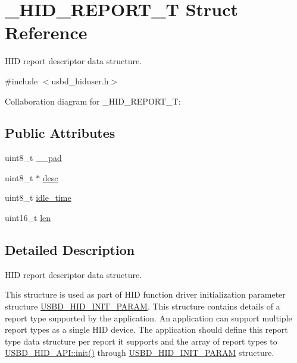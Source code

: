 \hypertarget{struct__HID__REPORT__T}{}\section{\+\_\+\+H\+I\+D\+\_\+\+R\+E\+P\+O\+R\+T\+\_\+T Struct Reference}
\label{struct__HID__REPORT__T}


H\+ID report descriptor data structure.  




{\ttfamily \#include $<$usbd\+\_\+hiduser.\+h$>$}



Collaboration diagram for \+\_\+\+H\+I\+D\+\_\+\+R\+E\+P\+O\+R\+T\+\_\+T\+:
\subsection*{Public Attributes}
\begin{DoxyCompactItemize}
\item 
uint8\+\_\+t \hyperlink{struct__HID__REPORT__T_a9d56a95a8b9dbdc3bfaec651d23bd360}{\+\_\+\+\_\+pad}
\item 
uint8\+\_\+t $\ast$ \hyperlink{struct__HID__REPORT__T_a312421c8506e4dcd1ba2d40a9c409211}{desc}
\item 
uint8\+\_\+t \hyperlink{struct__HID__REPORT__T_a388e7eacbfc2006e0ada9e81da54760b}{idle\+\_\+time}
\item 
uint16\+\_\+t \hyperlink{struct__HID__REPORT__T_a4c0e68b7360c08788605db4eb667cb4e}{len}
\end{DoxyCompactItemize}


\subsection{Detailed Description}
H\+ID report descriptor data structure. 

This structure is used as part of H\+ID function driver initialization parameter structure \hyperlink{structUSBD__HID__INIT__PARAM}{U\+S\+B\+D\+\_\+\+H\+I\+D\+\_\+\+I\+N\+I\+T\+\_\+\+P\+A\+R\+AM}. This structure contains details of a report type supported by the application. An application can support multiple report types as a single H\+ID device. The application should define this report type data structure per report it supports and the array of report types to \hyperlink{structUSBD__HID__API_a7b98c434713f1deb07abafcb52fae76d}{U\+S\+B\+D\+\_\+\+H\+I\+D\+\_\+\+A\+P\+I\+::init()} through \hyperlink{structUSBD__HID__INIT__PARAM}{U\+S\+B\+D\+\_\+\+H\+I\+D\+\_\+\+I\+N\+I\+T\+\_\+\+P\+A\+R\+AM} structure.

